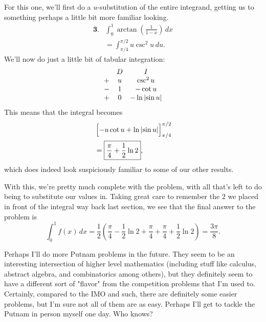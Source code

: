 For this one, we'll first do a \( u \)-substitution of the entire integrand,
getting us to something perhaps a little bit more familiar looking.
\begin{align*}
    \textbf{3.} &\int_{ 0 }^{ 1 } \arctan{\left( \frac{1}{1 - x} \right)} \, dx \\
    &= \int_{\pi/4}^{\pi/2} u \csc^2{u} \, du
.\end{align*}
We'll now do just a little bit of tabular integration:
\[
\begin{array}{ccc}
    & D & I \\
    + & u & \csc^2{u} \\
    - & 1 & -\cot{u} \\
    + & 0 & -\ln{\ensuremath{\left\lvert \sin{u} \right\rvert}}
\end{array}
\]
This means that the integral becomes
\begin{align*}
    &\left[ -u\cot{u} + \ln{\abs{\sin{u}}} \rule{0pt}{10pt} \right]_{\pi/4}^{\pi/2} \\
    &= \boxed{\frac{\pi}{4} + \frac{1}{2} \ln{2}}
,\end{align*}
which does indeed look suspiciously familiar to some of our other results.

With this, we're pretty much complete with the problem, with all that's left to
do being to substitute our values in. Taking great care to remember the \( 2 \)
we placed in front of the integral way back last section, we see that the final
answer to the problem is
\[
    \int_{0}^{1} f \left( x \right) \, dx = \frac{1}{2} \left( \frac{\pi}{4} - \frac{1}{2} \ln{2} + \frac{\pi}{4} + \frac{\pi}{4} + \frac{1}{2} \ln{2} \right) = \boxed{\frac{3 \pi}{8}}
.\]

Perhaps I'll do more Putnam problems in the future. They seem to be an
interesting intersection of higher level mathematics (including stuff like
calculus, abstract algebra, and combinatorics among others), but they
definitely seem to have a different sort of "flavor" from the competition
problems that I'm used to. Certainly, compared to the IMO and such, there are
definitely some easier problems, but I'm sure not all of them are as easy.
Perhaps I'll get to tackle the Putnam in person myself one day. Who knows?
